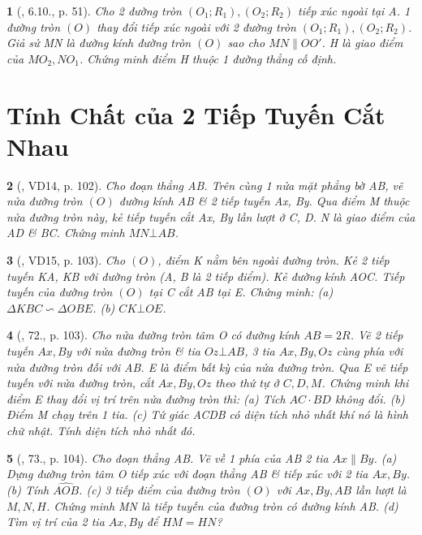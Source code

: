\documentclass{article}
\newtheorem{baitoan}{}
\begin{document}
\begin{baitoan}[\cite{TLCT_THCS_Toan_9_hinh_hoc}, 6.10., p. 51]
	Cho 2 đường tròn $(O_1;R_1),(O_2;R_2)$ tiếp xúc ngoài tại A. 1 đường tròn $(O)$ thay đổi tiếp xúc ngoài với 2 đường tròn $(O_1;R_1),(O_2;R_2)$. Giả sử MN là đường kính đường tròn $(O)$ sao cho $MN\parallel OO'$. H là giao điểm của $MO_2,NO_1$. Chứng minh điểm H thuộc 1 đường thẳng cố định.
\end{baitoan}


\section{Tính Chất của 2 Tiếp Tuyến Cắt Nhau}

\begin{baitoan}[\cite{Binh_Toan_9_tap_1}, VD14, p. 102]
	Cho đoạn thẳng AB. Trên cùng 1 nửa mặt phẳng bờ AB, vẽ nửa đường tròn $(O)$ đường kính AB \& 2 tiếp tuyến Ax, By. Qua điểm M thuộc nửa đường tròn này, kẻ tiếp tuyến cắt Ax, By lần lượt ở C, D. N là giao điểm của AD \& BC. Chứng minh $MN\bot AB$.
\end{baitoan}

\begin{baitoan}[\cite{Binh_Toan_9_tap_1}, VD15, p. 103]
	Cho $(O)$, điểm K nằm bên ngoài đường tròn. Kẻ 2 tiếp tuyến KA, KB với đường tròn (A, B là 2 tiếp điểm). Kẻ đường kính AOC. Tiếp tuyến của đường tròn $(O)$ tại C cắt AB tại E. Chứng minh: (a) $\Delta KBC\backsim\Delta OBE$. (b) $CK\bot OE$.
\end{baitoan}

\begin{baitoan}[\cite{Binh_Toan_9_tap_1}, 72., p. 103]
	Cho nửa đường tròn tâm O có đường kính $AB = 2R$. Vẽ 2 tiếp tuyến $Ax,By$ với nửa đường tròn \& tia $Oz\bot AB$, 3 tia $Ax,By,Oz$ cùng phía với nửa đường tròn đối với AB. E là điểm bất kỳ của nửa đường tròn. Qua E vẽ tiếp tuyến với nửa đường tròn, cắt $Ax,By,Oz$ theo thứ tự ở $C,D,M$. Chứng minh khi điểm E thay đổi vị trí trên nửa đường tròn thì: (a) Tích $AC\cdot BD$ không đổi. (b) Điểm M chạy trên 1 tia. (c) Tứ giác ACDB có diện tích nhỏ nhất khí nó là hình chữ nhật. Tính diện tích nhỏ nhất đó.
\end{baitoan}

\begin{baitoan}[\cite{Binh_Toan_9_tap_1}, 73., p. 104]
	Cho đoạn thẳng AB. Vẽ về 1 phía của AB 2 tia $Ax\parallel By$. (a) Dựng đường tròn tâm O tiếp xúc với đoạn thẳng AB \& tiếp xúc với 2 tia $Ax,By$. (b) Tính $\widehat{AOB}$. (c) 3 tiếp điểm của đường tròn $(O)$ với $Ax,By,AB$ lần lượt là $M,N,H$. Chứng minh MN là tiếp tuyến của đường tròn có đường kính AB. (d) Tìm vị trí của 2 tia $Ax,By$ để $HM = HN$?
\end{baitoan}
\end{document}
